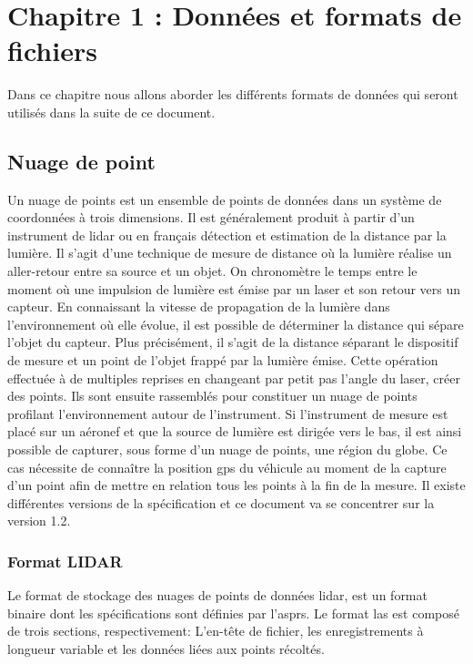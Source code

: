 \chapter{Chapitre 1 : Données et formats de fichiers}
Dans ce chapitre nous allons aborder les différents formats de données qui seront
utilisés dans la suite de ce document.

\section{Nuage de point}
Un nuage de points est un ensemble de points de données dans un système de
coordonnées à trois dimensions. Il est généralement produit à partir d'un
instrument de \gls{lidar} ou en français détection et estimation de la distance
par la lumière. Il s'agit d'une technique de mesure de distance où la lumière réalise un 
aller-retour entre sa source et un objet. On chronomètre le temps entre le moment
où une impulsion de lumière est émise par un laser et son retour vers un capteur.
En connaissant la vitesse de propagation de la lumière dans l’environnement où elle
évolue, il est possible de déterminer la distance qui sépare l’objet du capteur.
Plus précisément, il s’agit de la distance séparant le dispositif de mesure et
un point de l’objet frappé par la lumière émise. 
Cette opération effectuée à de multiples reprises en changeant par petit pas
l’angle du laser, créer des points. Ils sont ensuite rassemblés pour constituer un nuage de points profilant l'environnement autour de l'instrument.
Si l'instrument de mesure est placé sur un aéronef et que la source de lumière est
dirigée vers le bas, il est ainsi possible de capturer, sous forme d'un nuage de
points, une région du globe. Ce cas nécessite de connaître la position \gls{gps} du véhicule au moment de la capture d'un point afin de mettre en relation
tous les points à la fin de la mesure.
Il existe différentes versions de la spécification et ce document va se concentrer sur la version 1.2.

\subsection{Format LIDAR}
Le format de stockage des nuages de points de données \gls{lidar}, est un format
binaire dont les spécifications sont définies par l'\gls{asprs}.
Le format \gls{las} est composé de trois sections, respectivement:
L'en-tête de fichier, les enregistrements à longueur variable et les données liées aux points récoltés.

